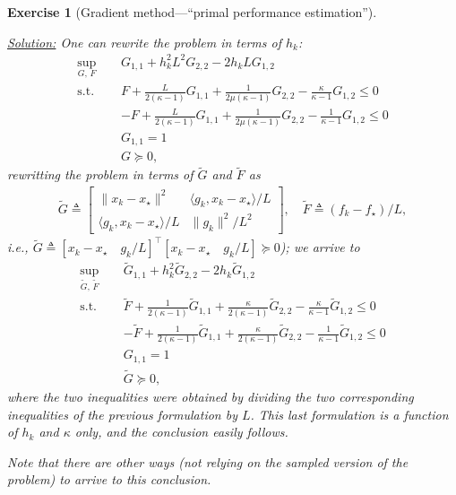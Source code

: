 \documentclass[11pt,a4paper]{article}
\newcommand{\correction}[1]{{{\color{blue}\underline{Solution:} #1}}}
\newcommand{\correction}[1]{}
\newtheorem{exercise}{Exercise}
\begin{document}
\begin{exercise}[Gradient method---``primal performance estimation'']
\begin{enumerate}
	\correction{One can rewrite the problem in terms of $h_k$:\begin{equation*}
			\begin{aligned}
			\sup_{G,\, F} \quad & G_{1,1}+h_k ^2 L^2 G_{2,2}-2h_k L G_{1,2}\\
			\text{s.t. } \quad & F + \tfrac{L}{2(\kappa-1)} G_{1,1}+\tfrac{1}{2\mu(\kappa-1)}G_{2,2}-\tfrac{\kappa}{\kappa-1}G_{1,2}\leqslant 0\\
			&-F + \tfrac{L}{2(\kappa-1)} G_{1,1}+\tfrac{1}{2\mu(\kappa-1)}G_{2,2}-\tfrac{1}{\kappa-1}G_{1,2}\leqslant 0\\
			&G_{1,1}= 1\\
			&G\succcurlyeq 0,
			\end{aligned}
			\end{equation*}
			rewritting the problem in terms of $\tilde{G}$ and $\tilde{F}$ as
			\begin{align*}
			\tilde{G} \triangleq \begin{bmatrix}
			\|x_k-x_\star\|^2 & \langle g_k,x_k-x_\star\rangle/L\\
			\langle g_k, x_k-x_\star\rangle/L & \| g_k\|^2/L^2
			\end{bmatrix},\quad 	\tilde{F} \triangleq 		(	f_k-f_\star)/L,
			\end{align*}
			i.e., $\tilde{G}\triangleq [x_k-x_\star \quad g_k/L]^\top [x_k-x_\star \quad  g_k/L]\succcurlyeq 0$); we arrive to\begin{equation*}
			\begin{aligned}
			\sup_{\tilde{G},\, \tilde{F}} \quad & \tilde{G}_{1,1}+h_k ^2 \tilde{G}_{2,2}-2h_k \tilde{G}_{1,2}\\
			\text{s.t. } \quad & \tilde{F} + \tfrac{1}{2(\kappa-1)} \tilde{G}_{1,1}+\tfrac{\kappa}{2(\kappa-1)}\tilde{G}_{2,2}-\tfrac{\kappa}{\kappa-1}\tilde{G}_{1,2}\leqslant 0\\
			&-\tilde{F} + \tfrac{1}{2(\kappa-1)} \tilde{G}_{1,1}+\tfrac{\kappa}{2(\kappa-1)}\tilde{G}_{2,2}-\tfrac{1}{\kappa-1}\tilde{G}_{1,2}\leqslant 0\\
			&G_{1,1}= 1\\
			&\tilde{G}\succcurlyeq 0,
			\end{aligned}
			\end{equation*}
			where the two inequalities were obtained by dividing the two corresponding inequalities of the previous formulation by $L$. This last formulation is a function of $h_k$ and $\kappa$ only, and the conclusion easily follows.
			
			Note that there are other ways (not relying on the sampled version of the problem) to arrive to this conclusion.}
			

\end{enumerate}
\end{exercise}
\end{document}
